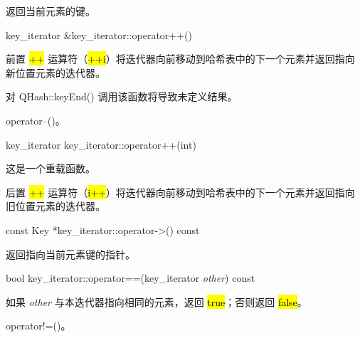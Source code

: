返回当前元素的键。

key\_iterator \&key\_iterator::operator++()

前置 \hl{++} 运算符（\hl{++i}）将迭代器向前移动到哈希表中的下一个元素并返回指向新位置元素的迭代器。

对 QHash::keyEnd() 调用该函数将导致未定义结果。



\begin{notice}[另请参阅]
operator--()。
\end{notice}


key\_iterator key\_iterator::operator++(int)

这是一个重载函数。

后置 \hl{++} 运算符（\hl{i++}）将迭代器向前移动到哈希表中的下一个元素并返回指向旧位置元素的迭代器。

const Key *key\_iterator::operator->() const

返回指向当前元素键的指针。

bool key\_iterator::operator==(key\_iterator \emph{other}) const

如果 \emph{other} 与本迭代器指向相同的元素，返回 \hl{true}；否则返回 \hl{false}。


\begin{notice}[另请参阅]
operator!=()。
\end{notice}

